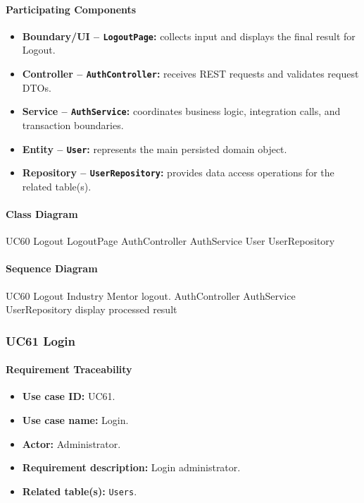 \paragraph{Participating Components}

\begin{itemize}
    \item \textbf{Boundary/UI -- \texttt{LogoutPage}:} collects input and displays the final result for Logout.
    \item \textbf{Controller -- \texttt{AuthController}:} receives REST requests and validates request DTOs.
    \item \textbf{Service -- \texttt{AuthService}:} coordinates business logic, integration calls, and transaction boundaries.
    \item \textbf{Entity -- \texttt{User}:} represents the main persisted domain object.
    \item \textbf{Repository -- \texttt{UserRepository}:} provides data access operations for the related table(s).
\end{itemize}

\paragraph{Class Diagram}

\ClassDiagram
{UC60 Logout}
{LogoutPage}
{AuthController}
{AuthService}
{User}
{UserRepository}

\paragraph{Sequence Diagram}

\SequenceDiagram
{UC60 Logout}
{Industry Mentor}
{logout.}
{AuthController}
{AuthService}
{UserRepository}
{display processed result}

\subsubsection{UC61 Login}

\paragraph{Requirement Traceability}

\begin{itemize}
    \item \textbf{Use case ID:} UC61.
    \item \textbf{Use case name:} Login.
    \item \textbf{Actor:} Administrator.
    \item \textbf{Requirement description:} Login administrator.
    \item \textbf{Related table(s):} \texttt{Users}.
\end{itemize}

